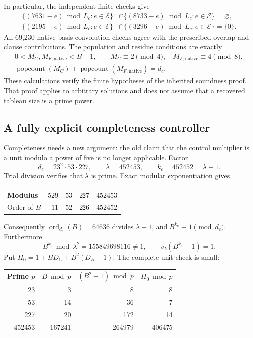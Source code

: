 \documentclass[11pt,letterpaper]{article}
\theoremstyle{remark}
\begin{document}
In particular, the independent finite checks give
\begin{align*}
 \{(7631-e)\bmod L_c:e\in\mathcal E\}
 &\cap\{(8733-e)\bmod L_c:e\in\mathcal E\}=\varnothing,\\
 \{(2195-e)\bmod L_c:e\in\mathcal E\}
 &\cap\{(3296-e)\bmod L_c:e\in\mathcal E\}=\{0\}.
\end{align*}
All 69,230 native-basis convolution checks agree with the prescribed
overlap and clause contributions.  The population and residue conditions
are exactly
\begin{gather*}
0<M_C,M_{F,\mathrm{native}}<B-1,\qquad
M_C\equiv2\pmod4,\quad M_{F,\mathrm{native}}\equiv4\pmod8,\\
\operatorname{popcount}(M_C)+
\operatorname{popcount}(M_{F,\mathrm{native}})=d_c.
\end{gather*}
These calculations verify the finite hypotheses of the inherited
soundness proof.  That proof applies to arbitrary solutions and does not
assume that a recovered tableau size is a prime power.

\subsection{A fully explicit completeness controller}

Completeness needs a new argument: the old claim that the control
multiplier is a unit modulo a power of five is no longer applicable.
Factor
\[
 d_c=23^2\cdot53\cdot227,
 \qquad \lambda=452453,\qquad k_c=452452=\lambda-1.
\]
Trial division verifies that $\lambda$ is prime.  Exact modular
exponentiation gives
\begin{center}
\begin{tabular}{lrrrr}
\toprule
Modulus & $529$ & $53$ & $227$ & $452453$\\
\midrule
Order of $B$ & $11$ & $52$ & $226$ & $452452$\\
\bottomrule
\end{tabular}
\end{center}
Consequently $\operatorname{ord}_{d_c}(B)=64636$ divides $\lambda-1$,
and $B^{k_c}\equiv1\pmod{d_c}$.  Furthermore
\[
 B^{k_c}\bmod\lambda^2=155849698116\ne1,
 \qquad v_\lambda(B^{k_c}-1)=1.
\]
Put $H_0=1+BD_C+B^2(D_R+1)$.  The complete unit check is small:
\begin{center}
\begin{tabular}{rrrr}
\toprule
Prime $p$ & $B\bmod p$ & $(B^2-1)\bmod p$ & $H_0\bmod p$\\
\midrule
23 & 3 & 8 & 8\\
53 & 14 & 36 & 7\\
227 & 20 & 172 & 14\\
452453 & 167241 & 264979 & 406475\\
\bottomrule
\end{tabular}
\end{center}
\end{document}
